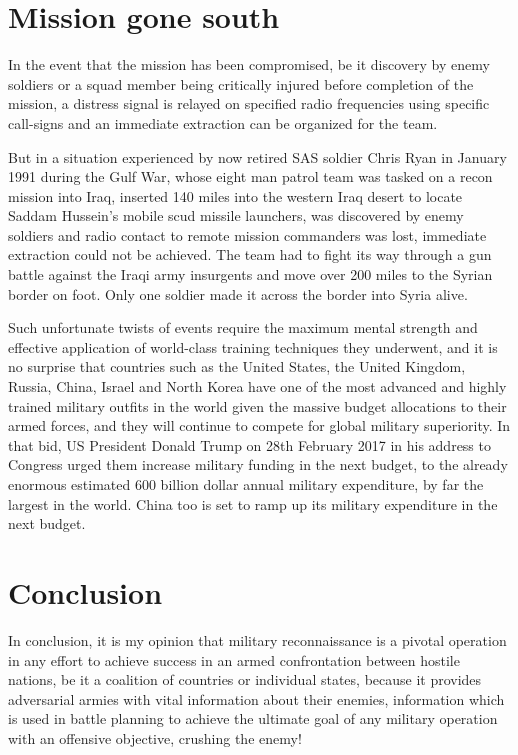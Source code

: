 \documentclass{article}
\begin{document}
\section{Mission gone south} 
In the event that the mission has been compromised, be it discovery by enemy soldiers or a squad member being critically injured before completion of the mission,
 a distress signal is relayed on specified radio frequencies using specific call-signs and an immediate extraction can be organized for the team.

 But in a situation experienced by now retired SAS soldier Chris Ryan in January 1991 during the Gulf War, whose eight man patrol team was tasked on a recon mission into Iraq,
 inserted 140 miles into the western Iraq desert to locate Saddam Hussein’s mobile scud missile launchers, was discovered by enemy soldiers and radio contact to remote mission commanders was lost,
 immediate extraction could not be achieved. The team had to fight its way through a gun battle against the Iraqi army insurgents and move over 200 miles to the Syrian border on foot. Only one soldier made it across the border into Syria alive. 

Such unfortunate twists of events require the maximum mental strength and effective application of world-class training techniques they underwent, and it is no surprise that countries such as the United States, the United Kingdom, Russia, China, Israel and North Korea have one of the most advanced and highly trained military outfits in the world given the massive budget allocations to their armed forces, and they will continue to compete for global military superiority. In that bid, US President Donald Trump on 28th February 2017 in his address to Congress urged them increase military funding in the next budget, to the already enormous estimated 600 billion dollar annual military expenditure, by far the largest in the world. China too is set to ramp up its military expenditure in the next budget.

\section{Conclusion} 
In conclusion, it is my opinion that military reconnaissance is a pivotal operation in any effort to achieve success in an armed confrontation between hostile nations,
 be it a coalition of countries or individual states, because it provides adversarial armies with vital information about their enemies, information which is  used in battle planning
 to achieve the ultimate goal of any military operation with an offensive objective, crushing the enemy! 
\end{document}
